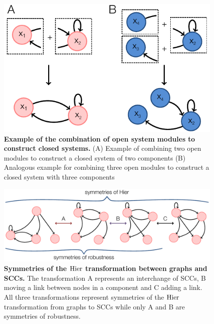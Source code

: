 \begin{figure}[!ht]
\centering
\noindent\includegraphics[width=0.4\columnwidth]{fig/examplesystemmodules.pdf}
\caption{{\bf Example of the combination of open system modules to construct closed systems.} (A) Example of combining two open modules to construct a closed system of two components (B) Analogous example for combining three open modules to construct a closed system with three components}
\label{fig:examplesystemmodules}
\end{figure}

\pagebreak

\begin{figure}[!ht]
\centering
\noindent\includegraphics[width=0.7\columnwidth]{fig/hiertransformations.pdf}
\caption{{\bf Symmetries of the $\mathrm{Hier}$ transformation between graphs and SCCs.} The transformation A represents an interchange of SCCs, B moving a link between nodes in a component and C adding a link. All three transformations represent symmetries of the $\mathrm{Hier}$ transformation from graphs to SCCs while only A and B are symmetries of robustness.}
\label{fig:hiertransformations}
\end{figure}

\pagebreak

